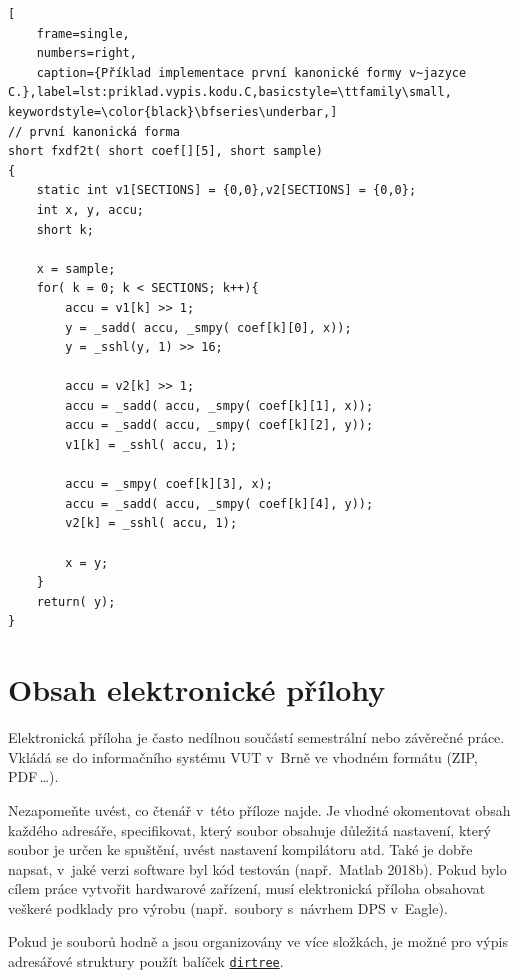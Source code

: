 \begin{minipage}{\linewidth}
\begin{lstlisting}[
	frame=single,
	numbers=right,
	caption={Příklad implementace první kanonické formy v~jazyce C.},label=lst:priklad.vypis.kodu.C,basicstyle=\ttfamily\small, keywordstyle=\color{black}\bfseries\underbar,]
// první kanonická forma
short fxdf2t( short coef[][5], short sample)
{
	static int v1[SECTIONS] = {0,0},v2[SECTIONS] = {0,0};
	int x, y, accu;
	short k;

	x = sample;
	for( k = 0; k < SECTIONS; k++){
		accu = v1[k] >> 1;
		y = _sadd( accu, _smpy( coef[k][0], x));
		y = _sshl(y, 1) >> 16;

		accu = v2[k] >> 1;
		accu = _sadd( accu, _smpy( coef[k][1], x));
		accu = _sadd( accu, _smpy( coef[k][2], y));
		v1[k] = _sshl( accu, 1);

		accu = _smpy( coef[k][3], x);
		accu = _sadd( accu, _smpy( coef[k][4], y));
		v2[k] = _sshl( accu, 1);

		x = y;
	}
	return( y);
}
\end{lstlisting}
\end{minipage}







\chapter{Obsah elektronické přílohy}
Elektronická příloha je často nedílnou součástí semestrální nebo závěrečné práce.
Vkládá se do informačního systému VUT v~Brně ve vhodném formátu (ZIP, PDF\,\dots).

Nezapomeňte uvést, co čtenář v~této příloze najde.
Je vhodné okomentovat obsah každého adresáře, specifikovat, který soubor obsahuje důležitá nastavení, který soubor je určen ke spuštění, uvést nastavení kompilátoru atd.
Také je dobře napsat, v~jaké verzi software byl kód testován (např.\ Matlab 2018b).
Pokud bylo cílem práce vytvořit hardwarové zařízení,
musí elektronická příloha obsahovat veškeré podklady pro výrobu (např.\ soubory s~návrhem DPS v~Eagle).

Pokud je souborů hodně a jsou organizovány ve více složkách, je možné pro výpis adresářové struktury použít balíček \href{https://www.ctan.org/pkg/dirtree}{\texttt{dirtree}}.

